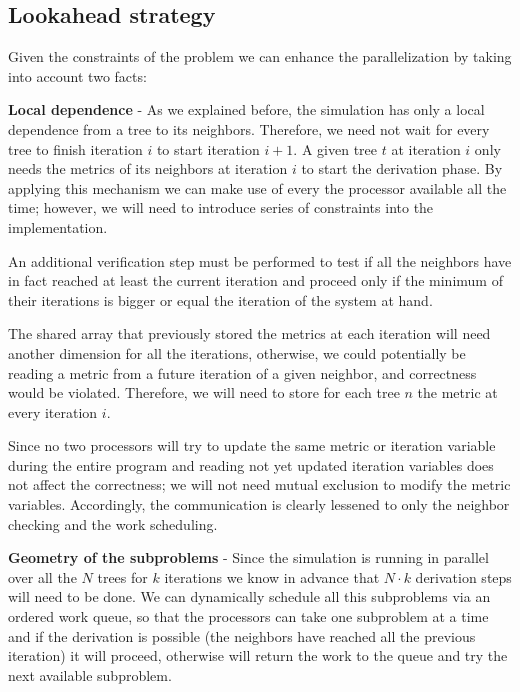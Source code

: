 \documentclass[letterpaper,twoside,11pt]{article}
\begin{document}
\begin{multicols}{2}

\subsection{Lookahead strategy} %
\label{sub:lookahead_startegy}

Given the constraints of the problem we can enhance the parallelization by taking into account two facts:
\begin{compactenum}[a)]
\item \textbf{Local dependence} - As we explained before, the simulation has only a local dependence from a tree to its neighbors. Therefore, we need not wait for every tree to finish iteration $i$ to start iteration $i+1$. A given tree $t$ at iteration $i$ only needs the metrics of its neighbors at iteration $i$ to start the derivation phase. By applying this mechanism we can make use of every the processor available all the time; however, we will need to introduce series of constraints into the implementation.

An additional verification step must be performed to test if all the neighbors have in fact reached at least the current iteration and proceed only if the minimum of their iterations is bigger or equal the iteration of the system at hand.

The shared array that previously stored the metrics at each iteration will need another dimension for all the iterations, otherwise, we could potentially be reading a metric from a future iteration of a given neighbor, and correctness would be violated. Therefore, we will need to store for each tree $n$ the metric at every iteration $i$.

Since no two processors will try to update the same metric or iteration variable during the entire program and reading not yet updated iteration variables does not affect the correctness; we will not need mutual exclusion to modify the metric variables. Accordingly, the communication is clearly lessened to only the neighbor checking and the work scheduling.

\item \textbf{Geometry of the subproblems} - Since the simulation is running in parallel over all the $N$ trees for $k$ iterations we know in advance that $N \cdot k $ derivation steps will need to be done. We can dynamically schedule all this subproblems via an ordered work queue, so that the processors can take one subproblem at a time and if the derivation is possible (the neighbors have reached all the previous iteration) it will proceed, otherwise will return the work to the queue and try the next available subproblem.


\end{compactenum}
\end{multicols}
\end{document}
